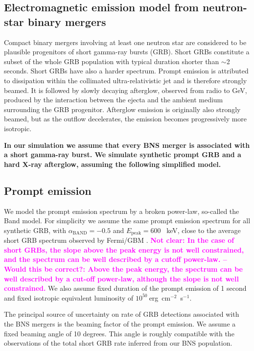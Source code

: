 \documentclass[a0,portrait]{a0poster}
\renewcommand{\emph}[1]{\textbf{\color{blue}#1}}
\newcommand{\ECM}[1] {\textbf{\textcolor{magenta}{#1}}}
\begin{document}
\begin{multicols}{2}
\section*{Electromagnetic emission model from neutron-star binary mergers}

Compact binary mergers involving at least one neutron star are considered to be
plausible progenitors of short gamma-ray bursts (GRB). Short GRBs constitute a
subset of the whole GRB population with typical duration shorter than $\sim$2
seconds. Short GRBs have also a harder spectrum.  Prompt emission is attributed
to dissipation within the collimated ultra-relativistic jet and is therefore
strongly beamed. It is followed by slowly decaying afterglow, observed from
radio to GeV, produced by the interaction between the ejecta and the ambient
medium surrounding the GRB progenitor. Afterglow emission is originally also
strongly beamed, but as the outflow decelerates, the emission becomes
progressively more isotropic.

\emph{In our simulation we assume that every BNS merger is associated with a short
gamma-ray burst. We simulate synthetic prompt GRB and a hard X-ray afterglow,
assuming the following simplified model.}

\subsection*{Prompt emission}
We model the prompt emission spectrum by a broken power-law, so-called the Band
\cite{band93} model. For simplicity we assume the same prompt emission spectrum
for all synthetic GRB, with $\alpha_{\mathrm{BAND}} = - 0.5$ and
$E_{\mathrm{peak}} = 600$ \, keV, close to the average short GRB spectrum
observed by Fermi/GBM \cite{gruber14}.  \ECM{Not clear: In the case of short
  GRBs, the slope above the peak energy is not well constrained, and the
  spectrum can be well described by a cutoff power-law. -- Would this be
  correct?: Above the peak energy, the spectrum can be well described by a
  cut-off power-law, although the slope is not well constrained.} We also assume
fixed duration of the prompt emission of 1 second and fixed isotropic equivalent
luminosity of $10^{50}~$erg~cm$^{-2}$~s$^{-1}$.

The principal source of uncertainty on rate of GRB detections associated with
the BNS mergers is the beaming factor of the prompt emission. We assume a fixed
beaming angle of 10 degrees. This angle is roughly compatible with the
observations of the total short GRB rate inferred from our BNS population.


\end{multicols}
\end{document}
